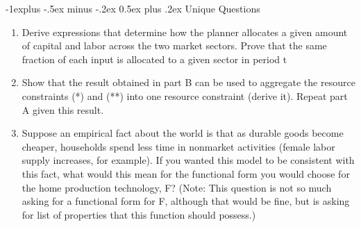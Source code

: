\documentclass[12pt,landscape]{extarticle}
\makeatletter
\renewcommand{\subsection}{\@startsection{subsection}{2}{0mm}%
                                {-1explus -.5ex minus -.2ex}%
                                {0.5ex plus .2ex}%
                                {\normalfont\normalsize\bfseries}}
\makeatother
\begin{document}
\begin{multicols*}{3}
    \subsection{Unique Questions}
    \begin{enumerate}
        \item Derive expressions that determine how the planner allocates a given amount of capital and
        labor across the two market sectors. Prove that the same fraction of each input is allocated to
        a given sector in period t
        \item Show that the result obtained in part B can be used to aggregate the resource constraints (*)
        and (**) into one resource constraint (derive it). Repeat part A given this result.
        \item Suppose an empirical fact about the world is that as durable goods become cheaper,
        households spend less time in nonmarket activities (female labor supply increases, for
        example). If you wanted this model to be consistent with this fact, what would this mean for
        the functional form you would choose for the home production technology, F? (Note: This
        question is not so much asking for a functional form for F, although that would be fine, but is
        asking for list of properties that this function should possess.)
    \end{enumerate}



\end{multicols*}
\end{document}
